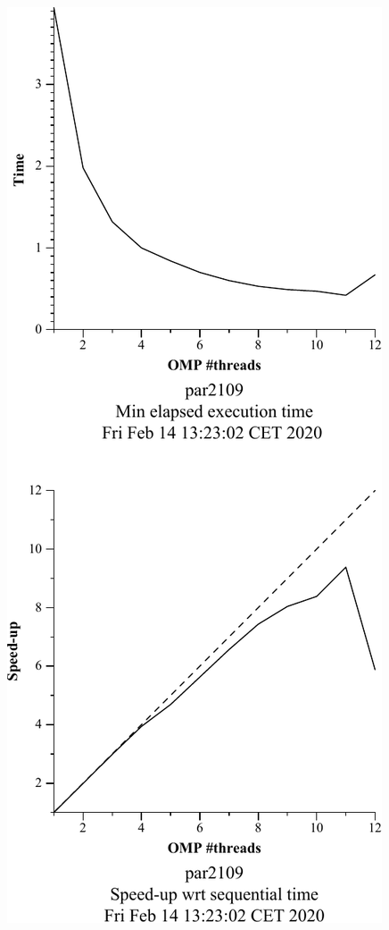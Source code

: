 \begin{figure}[H]
\centering
\begin{minipage}{.5\textwidth}
  \centering
  \includegraphics[width=.7\linewidth]{./data/pi/pi_omp-1000000000-1-12-3-strong-boada-2.pdf}
  \label{fig:strong}
\end{minipage}%
\begin{minipage}{.5\textwidth}
  \centering

\end{minipage}
\end{figure}
